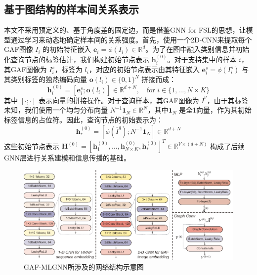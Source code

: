 \subsection{基于图结构的样本间关系表示}
\label{subsec:graph_relation_representation}

本文不采用预定义的、基于角度差的固定边，而是借鉴GNN for FSL的思想，让模型通过学习来动态地确定样本间的关系强度。首先，使用一个2D-CNN来提取每个GAF图像 $I_i$ 的初始特征嵌入 $\mathbf{e}_i = \phi(I_i) \in \mathbb{R}^d$。为了在图中融入类别信息并初始化查询节点的标签估计，我们构建初始节点表示 $\mathbf{h}_i^{(0)}$。对于支持集中的样本 $i$，其GAF图像为 $I_i^s$，标签为 $l_i$，对应的初始节点表示由其特征嵌入 $\mathbf{e}_i^s = \phi(I_i^s)$ 与其类别标签的独热编码向量 $\mathbf{o}(l_i) \in \{0, 1\}^N$ 拼接而成：
\begin{equation}
    \mathbf{h}_i^{(0)} = [\mathbf{e}_i^s ; \mathbf{o}(l_i)] \in \mathbb{R}^{d+N}, \quad \text{for } i \in \{1, \dots, N \times K\}
    \label{eq:support_node_init}
\end{equation}
其中 $[\cdot ; \cdot]$ 表示向量的拼接操作。对于查询样本，其GAF图像为 $\overline{I}^q$，由于其标签未知，我们使用一个均匀分布向量 $N^{-1}\mathbf{1}_N \in \mathbb{R}^N$，其中$\mathbf{1}_N$ 是全1向量，作为其初始标签信息的占位符。因此，查询节点的初始表示为：
\begin{equation}
    \mathbf{h}_*^{(0)} = [\phi(\overline{I}^q) ; N^{-1}\mathbf{1}_N] \in \mathbb{R}^{d+N}
    \label{eq:query_node_init}
\end{equation}
这些初始节点表示 $\mathbf{H}^{(0)} = [\mathbf{h}_1^{(0)}, \dots, \mathbf{h}_{N \times K}^{(0)}, \mathbf{h}_*^{(0)}]^T \in \mathbb{R}^{V \times (d+N)}$ 构成了后续GNN层进行关系建模和信息传播的基础。

\begin{figure}[h]
    \centering
    \includegraphics[width=\linewidth]{figures/struct_pro2.pdf}
    \caption{GAF-MLGNN所涉及的网络结构示意图}
    \label{fig:struct_pro2}
\end{figure}


